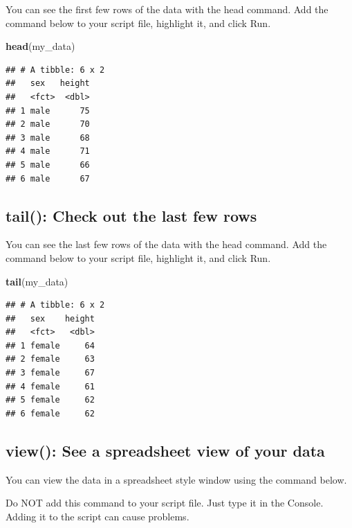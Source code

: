 \documentclass[
]{krantz}
\makeatletter
\newenvironment{Shaded}{\begin{snugshade}}{\end{snugshade}}
\newcommand{\KeywordTok}[1]{\textcolor[rgb]{0.27,0.27,0.27}{\textbf{#1}}}
\newcommand{\NormalTok}[1]{#1}
\newenvironment{kframe}{%
\medskip{}
\setlength{\fboxsep}{.8em}
 \def\at@end@of@kframe{}%
 \ifinner\ifhmode%
  \def\at@end@of@kframe{\end{minipage}}%
  \begin{minipage}{\columnwidth}%
 \fi\fi%
 \def\FrameCommand##1{\hskip\@totalleftmargin \hskip-\fboxsep
 \colorbox{shadecolor}{##1}\hskip-\fboxsep
     \hskip-\linewidth \hskip-\@totalleftmargin \hskip\columnwidth}%
 \MakeFramed {\advance\hsize-\width
   \@totalleftmargin\z@ \linewidth\hsize
   \@setminipage}}%
 {\par\unskip\endMakeFramed%
 \at@end@of@kframe}
\renewenvironment{Shaded}{\begin{kframe}}{\end{kframe}}
\makeatother
\begin{document}
You can see the first few rows of the data with the head command. Add the command below to your script file, highlight it, and click Run.

\begin{Shaded}
\begin{Highlighting}[]
\KeywordTok{head}\NormalTok{(my_data)}
\end{Highlighting}
\end{Shaded}

\begin{verbatim}
## # A tibble: 6 x 2
##   sex   height
##   <fct>  <dbl>
## 1 male      75
## 2 male      70
## 3 male      68
## 4 male      71
## 5 male      66
## 6 male      67
\end{verbatim}

\hypertarget{tail-check-out-the-last-few-rows}{%
\subsection{tail(): Check out the last few rows}\label{tail-check-out-the-last-few-rows}}

You can see the last few rows of the data with the head command. Add the command below to your script file, highlight it, and click Run.

\begin{Shaded}
\begin{Highlighting}[]
\KeywordTok{tail}\NormalTok{(my_data)}
\end{Highlighting}
\end{Shaded}

\begin{verbatim}
## # A tibble: 6 x 2
##   sex    height
##   <fct>   <dbl>
## 1 female     64
## 2 female     63
## 3 female     67
## 4 female     61
## 5 female     62
## 6 female     62
\end{verbatim}

\hypertarget{view-see-a-spreadsheet-view-of-your-data}{%
\subsection{view(): See a spreadsheet view of your data}\label{view-see-a-spreadsheet-view-of-your-data}}

You can view the data in a spreadsheet style window using the command below.

Do NOT add this command to your script file. Just type it in the Console. Adding it to the script can cause problems.
\end{document}

